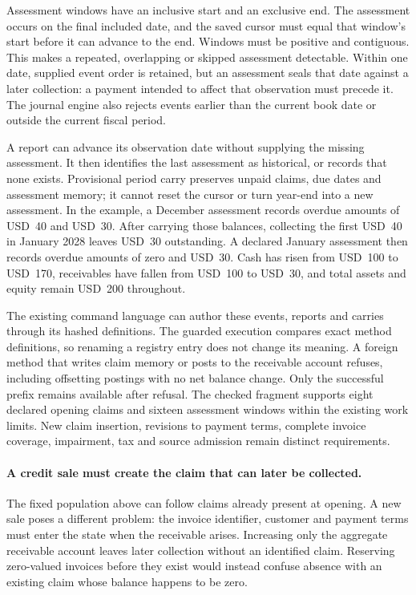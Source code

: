 Assessment windows have an inclusive start and an exclusive end. The assessment
occurs on the final included date, and the saved cursor must equal that window's
start before it can advance to the end. Windows must be positive and contiguous.
This makes a repeated, overlapping or skipped assessment detectable. Within one
date, supplied event order is retained, but an assessment seals that date against
a later collection: a payment intended to affect that observation must precede
it. The journal engine also rejects events earlier than the current book date
or outside the current fiscal period.

A report can advance its observation date without supplying the missing
assessment. It then identifies the last assessment as historical, or records
that none exists. Provisional period carry preserves unpaid claims, due dates
and assessment memory; it cannot reset the cursor or turn year-end into a new
assessment. In the example, a December assessment records overdue amounts of
USD~40 and USD~30. After carrying those balances, collecting the first USD~40
in January 2028 leaves USD~30 outstanding. A declared January assessment then
records overdue amounts of zero and USD~30. Cash has risen from USD~100 to
USD~170, receivables have fallen from USD~100 to USD~30, and total assets and
equity remain USD~200 throughout.

The existing command language can author these events, reports and carries
through its hashed definitions. The guarded execution compares exact method
definitions, so renaming a registry entry does not change its meaning. A foreign
method that writes claim memory or posts to the receivable account refuses,
including offsetting postings with no net balance change. Only the successful
prefix remains available after refusal. The checked fragment supports eight
declared opening claims and sixteen assessment windows within the existing work
limits. New claim insertion, revisions to payment terms, complete invoice
coverage, impairment, tax and source admission remain distinct requirements.


\paragraph{A credit sale must create the claim that can later be collected.}
The fixed population above can follow claims already present at opening. A new
sale poses a different problem: the invoice identifier, customer and payment
terms must enter the state when the receivable arises. Increasing only the
aggregate receivable account leaves later collection without an identified
claim. Reserving zero-valued invoices before they exist would instead confuse
absence with an existing claim whose balance happens to be zero.

